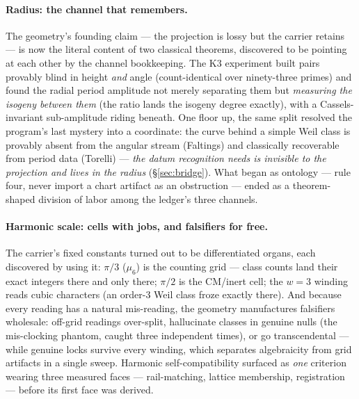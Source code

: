 \documentclass[11pt]{article}
\theoremstyle{definition}
\theoremstyle{remark}
\begin{document}
\paragraph{Radius: the channel that remembers.} The geometry's founding
claim --- the projection is lossy but the carrier retains --- is now the
literal content of two classical theorems, discovered to be pointing at
each other by the channel bookkeeping. The K3 experiment built pairs
provably blind in height \emph{and} angle (count-identical over ninety-three
primes) and found the radial period amplitude not merely separating them
but \emph{measuring the isogeny between them} (the ratio lands the isogeny
degree exactly), with a Cassels-invariant sub-amplitude riding beneath.
One floor up, the same split resolved the program's last mystery into a
coordinate: the curve behind a simple Weil class is provably absent from
the angular stream (Faltings) and classically recoverable from period data
(Torelli) --- \emph{the datum recognition needs is invisible to the
projection and lives in the radius}
(\S\ref{sec:bridge}). What began as ontology --- rule four, never import a
chart artifact as an obstruction --- ended as a theorem-shaped division of
labor among the ledger's three channels.

\paragraph{Harmonic scale: cells with jobs, and falsifiers for free.} The
carrier's fixed constants turned out to be differentiated organs, each
discovered by using it: $\pi/3$ ($\mu_6$) is the counting grid --- class
counts land their exact integers there and only there; $\pi/2$ is the
CM/inert cell; the $w=3$ winding reads cubic characters (an order-3 Weil
class froze exactly there). And because every reading has a natural
mis-reading, the geometry manufactures falsifiers wholesale: off-grid
readings over-split, hallucinate classes in genuine nulls (the mis-clocking
phantom, caught three independent times), or go transcendental --- while
genuine locks survive every winding, which separates algebraicity from
grid artifacts in a single sweep. Harmonic self-compatibility surfaced as
\emph{one} criterion wearing three measured faces --- rail-matching,
lattice membership, registration --- before its first face was derived.
\end{document}
